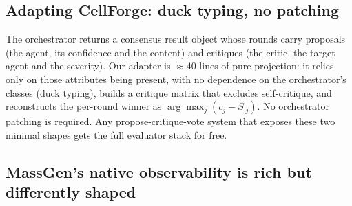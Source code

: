 \documentclass[10pt,a4paper]{article}
\begin{document}
\begin{table}[ht]
\small
\centering
{}
\caption{The components contributed by this work, the kind of each, and its status. The
design document released with the code gives the breakdown file by file.}
\label{tab:contrib}
\end{table}

\subsection{Adapting CellForge: duck typing, no patching}

The orchestrator returns a consensus result object whose rounds carry
proposals (the agent, its confidence and the content) and critiques (the
critic, the target agent and the severity). Our adapter is $\approx\!40$ lines of
pure projection: it relies only on those attributes being present, with no
dependence on the orchestrator's classes (duck typing), builds a critique
matrix that excludes self-critique, and reconstructs the per-round winner
as $\arg\max_j (c_j - \overline{S}_{\cdot j})$. No orchestrator patching is
required. Any propose-critique-vote system that exposes these two minimal
shapes gets the full evaluator stack for free.

\subsection{MassGen's native observability is rich but differently
shaped}\label{subsec:massgen_bridge}
\end{document}
